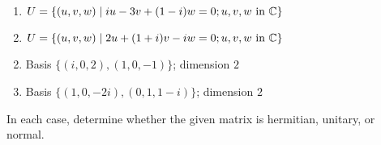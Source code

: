 \begin{multicols}{2}
\begin{ex}
\begin{enumerate}[label={\alph*.}]
\item $U = \{(u, v, w) \mid  iu - 3v + (1 - i)w = 0;\  \\ u, v, w \mbox{ in } \mathbb{C}\}$

\item $U = \{(u, v, w) \mid 2u + (1 + i)v - iw = 0;\ \\ u, v, w \mbox{ in } \mathbb{C}\}$

\end{enumerate}
\begin{sol}
\begin{enumerate}[label={\alph*.}]
\setcounter{enumi}{1}
\item  Basis $\{(i, 0, 2), (1, 0, -1)\}$; dimension $2$

\setcounter{enumi}{3}
\item  Basis $\{(1, 0, -2i), (0, 1, 1 - i)\}$; dimension $2$

\end{enumerate}
\end{sol}
\end{ex}

\begin{ex}
In each case, determine whether the given matrix is hermitian, unitary, or normal.


\end{ex}
\end{multicols}
